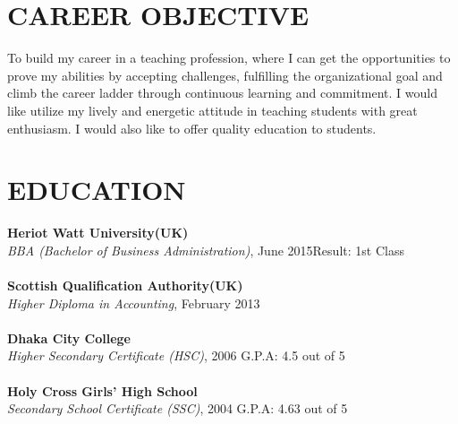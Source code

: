 \documentclass[margin]{res}
\begin{document}
\begin{resume}
%
\section{CAREER OBJECTIVE}
\par
To build my career in a teaching profession, where I can get the opportunities to prove my abilities by accepting challenges, fulfilling the organizational goal and climb the career ladder through continuous learning and commitment. I would like utilize my lively and energetic attitude in teaching students with great enthusiasm. I would also like to offer quality education to students.



\section{EDUCATION}
\textbf{Heriot Watt University(UK)}\\
{\sl BBA (Bachelor of Business Administration)}, June 2015\hfill Result: 
1st Class
\\ \\
\textbf{Scottish Qualification Authority(UK)}\\
{\sl Higher Diploma in Accounting}, February 2013 
\\ \\
\textbf{Dhaka City College}\\
{\sl Higher Secondary Certificate (HSC)}, 2006 \hfill G.P.A: 4.5 out of 5
\\ \\
\textbf{Holy Cross Girls' High School}\\
{\sl Secondary School Certificate (SSC)}, 2004 \hfill G.P.A: 4.63 out of 5




\end{resume}
\end{document}
